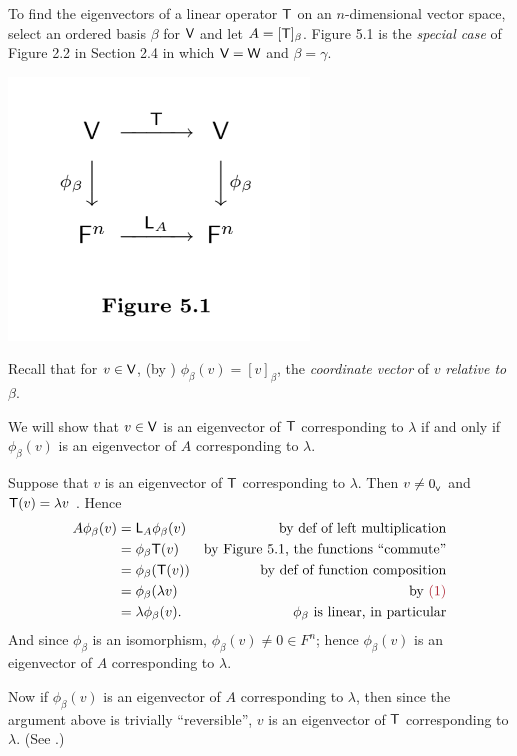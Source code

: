 \begin{remark} \label{remark 5.1.9}
To find the eigenvectors of a linear operator \(\textsf{T}\) on an \(n\)-dimensional vector space, select an ordered basis \(\beta\) for \(\textsf{V}\) and let \(A = [\textsf{T}]_{\beta}\).
Figure 5.1 is the \emph{special case} of Figure 2.2 in Section 2.4 in which \(\textsf{V} = \textsf{W}\) and \(\beta = \gamma\).

\includegraphics[width=8cm]{images/figure-5-1.png}

Recall that for \(v \in \textsf{V}\), (by ) \(\phi_{\beta}(v) = [v]_{\beta}\), the \emph{coordinate vector} of \(v\) \emph{relative to} \(\beta\).

We will show that \(v \in \textsf{V}\) is an eigenvector of \(\textsf{T}\) corresponding to \(\lambda\) if and only if \(\phi_{\beta}(v)\) is an eigenvector of \(A\) corresponding to \(\lambda\).

Suppose that \(v\) is an eigenvector of \(\textsf{T}\) corresponding to \(\lambda\).
Then \(v \ne 0_{_{\textsf{V}}}\) and \(\textsf{T}(v) = \lambda v\) .
Hence
\begin{align*}
    A \phi_{\beta}(v) & = \LMTRAN_A \phi_{\beta} (v) & \text{by def of left multiplication} \\
        & = \phi_{\beta} \T(v) & \text{by Figure 5.1, the functions ``commute''} \\
        & = \phi_{\beta}(\T(v)) & \text{by def of function composition} \\
        & = \phi_{\beta}(\lambda v) & \text{by \MAROON{(1)}} \\
        & = \lambda \phi_{\beta}(v). & \text{\(\phi_{\beta}\) is linear, in particular}
\end{align*}
And since \(\phi_{\beta}\) is an isomorphism, \(\phi_{\beta}(v) \ne 0 \in F^n\);
hence \(\phi_{\beta}(v)\) is an eigenvector of \(A\) corresponding to \(\lambda\).

Now if \(\phi_{\beta}(v)\) is an eigenvector of \(A\) corresponding to \(\lambda\), then since the argument above is trivially ``reversible'', \(v\) is an eigenvector of \(\textsf{T}\)
corresponding to \(\lambda\).
(See .)


\end{remark}
